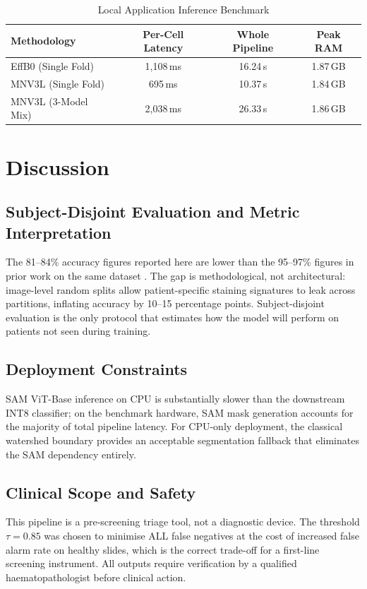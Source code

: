 \documentclass[journal,twoside,web]{ieeecolor}
\begin{document}
\begin{table}[!t]
\caption{Local Application Inference Benchmark}
\label{tab:edgebench}
\centering
\begin{tabular}{@{}lccc@{}}
\toprule
\textbf{Methodology} & \textbf{Per-Cell Latency} & \textbf{Whole Pipeline} & \textbf{Peak RAM} \\ \midrule
EffB0 (Single Fold) & 1,108\,ms & 16.24\,s & 1.87\,GB  \\
MNV3L (Single Fold) & 695\,ms & 10.37\,s & 1.84\,GB  \\
MNV3L (3-Model Mix) & 2,038\,ms & 26.33\,s & 1.86\,GB  \\ \bottomrule
\end{tabular}
\end{table}

\section{Discussion}
\label{sec:discussion}

\subsection{Subject-Disjoint Evaluation and Metric Interpretation}
The 81--84\% accuracy figures reported here are lower than the 95--97\% figures in prior work on the same dataset \cite{b7, b10}. The gap is methodological, not architectural: image-level random splits allow patient-specific staining signatures to leak across partitions, inflating accuracy by 10--15 percentage points. Subject-disjoint evaluation is the only protocol that estimates how the model will perform on patients not seen during training.

\subsection{Deployment Constraints}
SAM ViT-Base inference on CPU is substantially slower than the downstream INT8 classifier; on the benchmark hardware, SAM mask generation accounts for the majority of total pipeline latency. For CPU-only deployment, the classical watershed boundary provides an acceptable segmentation fallback that eliminates the SAM dependency entirely.

\subsection{Clinical Scope and Safety}
This pipeline is a pre-screening triage tool, not a diagnostic device. The threshold $\tau=0.85$ was chosen to minimise ALL false negatives at the cost of increased false alarm rate on healthy slides, which is the correct trade-off for a first-line screening instrument. All outputs require verification by a qualified haematopathologist before clinical action.
\end{document}
